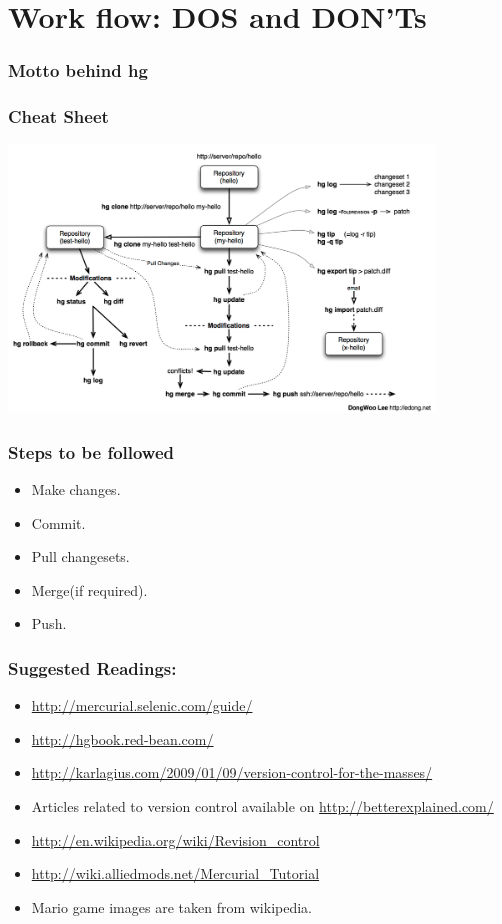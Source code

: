 \documentclass[14pt,compress]{beamer}
\newcounter{time}
\newcommand{\inctime}[1]{\addtocounter{time}{#1}{\tiny \thetime\ m}}
\begin{document}
\section{Work flow: DOS and DON'Ts}

\begin{frame}
  \frametitle{Motto behind hg}
  \begin{center}
  \color{red}{``Commit Early Commit Often.''}
  \end{center}  
\end{frame}

\begin{frame}
  \frametitle{Cheat Sheet}
  \begin{center}
  \includegraphics[height=2.8in]{mod}  
  \end{center}  
\end{frame}

\begin{frame}
  \frametitle{Steps to be followed}
  \begin{itemize}
  \item Make changes.
  \item Commit.
  \item Pull changesets.
  \item Merge(if required).
  \item Push.
  \end{itemize}
  \inctime{20}
\end{frame}

\begin{frame}
  \frametitle{Suggested Readings:}
  \begin{itemize}
  \item \url{http://mercurial.selenic.com/guide/}
  \item \url{http://hgbook.red-bean.com/}    
  \item \url{http://karlagius.com/2009/01/09/version-control-for-the-masses/}
  \item Articles related to version control available on \url{http://betterexplained.com/}
  \item \url{http://en.wikipedia.org/wiki/Revision_control}
  \item \url{http://wiki.alliedmods.net/Mercurial_Tutorial}
  \item Mario game images are taken from wikipedia.
  \end{itemize}
\end{frame}
\end{document}
